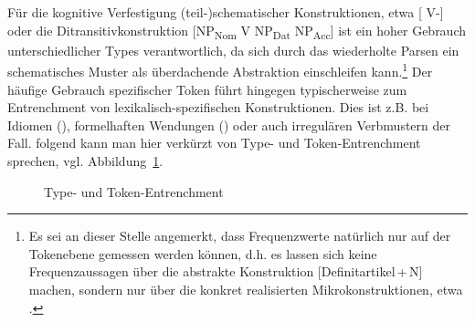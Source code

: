 Für die kognitive Verfestigung (teil-)schematischer Konstruktionen, 
etwa [ V-] \parencite{Flick2016} oder die Ditransitivkonstruktion [NP\textsubscript{Nom} V NP\textsubscript{Dat} NP\textsubscript{Acc}] \parencite{Goldberg2006} ist ein hoher Gebrauch unterschiedlicher Types verantwortlich, da sich durch das wiederholte Parsen ein schematisches Muster als überdachende Abstraktion einschleifen kann.\footnote{Es sei an dieser Stelle angemerkt, dass Frequenzwerte natürlich nur auf der Tokenebene gemessen werden können, d.h. es lassen sich keine Frequenzaussagen über die abstrakte Konstruktion [Definitartikel\,+\,N] machen, sondern nur über die konkret realisierten Mikrokonstruktionen, etwa .} 
Der häufige Gebrauch spezifischer Token führt hingegen typischerweise zum Entrenchment von lexikalisch-spe\-zi\-fisch\-en Konstruktionen. Dies ist z.B. bei Idiomen (), formelhaften Wendungen () oder auch irregulären Verbmustern der Fall. \textcite[103--104]{Ziem2013} folgend kann man hier verkürzt von Type- und Token-Entrenchment sprechen, vgl. Abbildung~\ref{abb:type-token-entrechment}.

\begin{figure}
\caption {Type- und Token-Entrenchment} 
\label{abb:type-token-entrechment}
\end{figure} 

